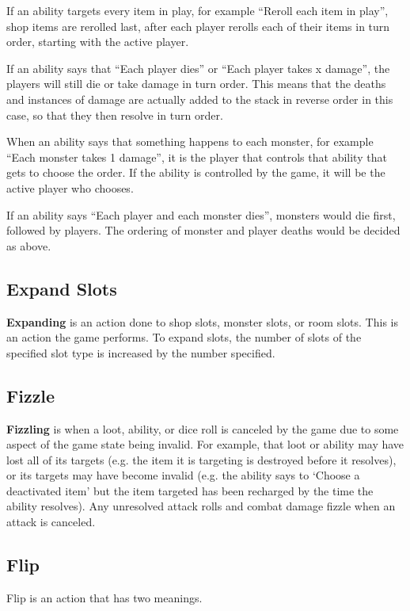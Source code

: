 \documentclass[10pt, a4paper, twoside]{article} %
\begin{document}
    If an ability targets every item in play, for example “Reroll each item in play”, shop items are rerolled last, after each player rerolls each of their items in turn order, starting with the active player.

    If an ability says that “Each player dies” or “Each player takes x damage”, the players will still die or take damage in turn order. This means that the deaths and instances of damage are actually added to the stack in reverse order in this case, so that they then resolve in turn order.

    When an ability says that something happens to each monster, for example “Each monster takes 1 damage”, it is the player that controls that ability that gets to choose the order. If the ability is controlled by the game, it will be the active player who chooses.

    If an ability says “Each player and each monster dies”, monsters would die first, followed by players. The ordering of monster and player deaths would be decided as above.
    \subsection{Expand Slots}
    \textbf{Expanding} is an action done to shop slots, monster slots, or room slots. This is an action the game performs. To expand slots, the number of slots of the specified slot type is increased by the number specified.
    \subsection{Fizzle}
    \textbf{Fizzling} is when a loot, ability, or dice roll is canceled by the game due to some aspect of the game state being invalid. For example, that loot or ability may have lost all of its targets (e.g. the item it is targeting is destroyed before it resolves), or its targets may have become invalid (e.g. the ability says to ‘Choose a deactivated item’ but the item targeted has been recharged by the time the ability resolves). Any unresolved attack rolls and combat damage fizzle when an attack is canceled.
    \subsection{Flip}
    Flip is an action that has two meanings.
\end{document}
